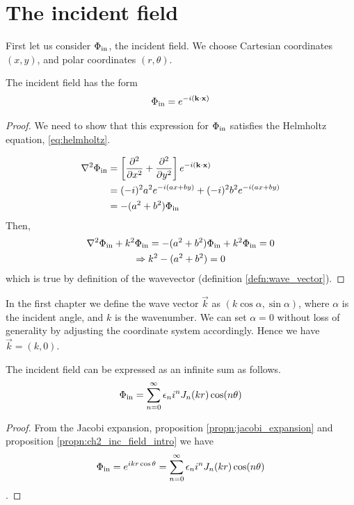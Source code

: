 \section{The incident field}
First let us consider $\Phi_{\text{in}}$, the incident field. We choose Cartesian coordinates $(x,y)$, and polar coordinates $(r, \theta)$.
    \begin{propn}\label{propn:ch2_inc_field_intro}
    The incident field has the form
        \begin{equation}
            \Phi_{\text{in}} = e^{-i(\mathbf{k}\cdot\mathbf{x})}
        \end{equation}
    \end{propn}
    \begin{proof}
    We need to show that this expression for $\Phi_{\text{in}}$ satisfies the Helmholtz equation, \eqref{eq:helmholtz}. \par
        \begin{align*}
            \nabla^2 \Phi_{\text{in}}
            &= \left[ \frac{\partial ^2}{\partial x^2} + \frac{\partial ^2}{\partial y^2} \right] e^{-i(\mathbf{k}\cdot\mathbf{x})} \\
            &= (-i)^2 a^2 e^{-i(ax+by)} + (-i)^2b^2 e^{-i(ax+by)}\\
            &= -(a^2+b^2)\Phi_{\text{in}}
        \end{align*}
    Then,
        \begin{gather*}
            \nabla^2 \Phi_{\text{in}} + k^2 \Phi_{\text{in}}
            = -(a^2+b^2)\Phi_{\text{in}} + k^2 \Phi_{\text{in}} = 0\\
            \Rightarrow k^2-(a^2+b^2)=0
        \end{gather*}
    which is true by definition of the wavevector (definition \ref{defn:wave_vector}).
    \end{proof}

In the first chapter we define the wave vector $\vec{k}$ as $(k\cos\alpha, \sin\alpha)$, where $\alpha$ is the incident angle, and $k$ is the wavenumber. We can set $\alpha = 0$ without loss of generality by adjusting the coordinate system accordingly. Hence we have $\vec{k}=(k, 0)$.

\begin{propn}\label{propn:ch2_inc_field_infty_sum}
The incident field can be expressed as an infinite sum as follows.
    \begin{equation*}\label{eq:ch2_inc_field_infty_sum}
        \Phi_{\text{in}} = \sum^{\infty}_{n=0} \epsilon_n i^n J_n(kr) \cos (n\theta)
    \end{equation*}
\end{propn}
\begin{proof} From the Jacobi expansion, proposition \ref{propn:jacobi_expansion} and proposition \ref{propn:ch2_inc_field_intro} we have
  \[\Phi_{\text{in}} =e^{ikr\cos\theta} = \sum^{\infty}_{n=0} \epsilon_n i^n J_n(kr) \cos(n\theta) \].
\end{proof}
